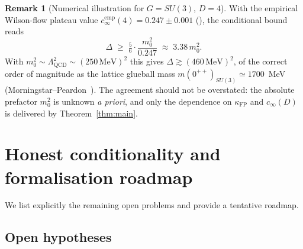 \documentclass[11pt,a4paper]{amsart}
\theoremstyle{definition}
\newtheorem{remark}[theorem]{Remark}
\newcommand{\kFP}{\kappa_{\mathrm{FP}}}
\newcommand{\cinf}{c_{\infty}}
\begin{document}
\begin{remark}[Numerical illustration for $G=SU(3)$, $D=4$]
With the empirical Wilson-flow plateau value
$\cinf^{\mathrm{emp}}(4) = 0.247\pm 0.001$
(\cite[Tab.~II]{RemondiereMassGapPRL_2026}), the conditional bound reads
$$
\Delta \;\geq\; \tfrac{5}{6}\cdot \frac{m_0^2}{0.247}
\;\approx\; 3.38\, m_0^2.
$$
With $m_0^2 \sim \Lambda_{\mathrm{QCD}}^2 \sim (250\,\mathrm{MeV})^2$
this gives $\Delta \gtrsim (460\,\mathrm{MeV})^2$, of the correct order of
magnitude as the lattice glueball mass $m(0^{++})_{SU(3)} \simeq 1700$~MeV
(Morningstar--Peardon~\cite{Morningstar1999}). The agreement should not be
overstated: the absolute prefactor $m_0^2$ is unknown
\textit{a priori}, and only the dependence on $\kFP$ and $\cinf(D)$ is
delivered by Theorem~\ref{thm:main}.
\end{remark}

\section{Honest conditionality and formalisation roadmap}\label{sec:honest}

We list explicitly the remaining open problems and provide a tentative
roadmap.

\subsection{Open hypotheses}
\end{document}
